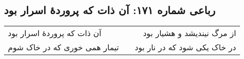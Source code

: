 \begin{center}
\section*{رباعی شماره ۱۷۱: آن ذات که پروردهٔ اسرار بود}
\label{sec:sh171}
\begin{longtable}{l p{0.5cm} r}
آن ذات که پروردهٔ اسرار بود
&&
از مرگ نیندیشد و هشیار بود
\\
تیمار همی خوری که در خاک شوم
&&
در خاک یکی شود که در نار بود
\\
\end{longtable}
\end{center}
